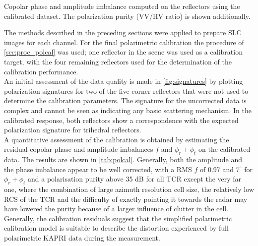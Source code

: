 								
\begin{table}[h]
	\centering
	\caption{Copolar phase and amplitude imbalance computed on the reflectors using the calibrated dataset. The polarization purity (VV/HV ratio) is shown additionally.}
	\label{tab:polcal}
\end{table}		
The methods described in the preceding sections were applied to prepare SLC images for each channel. For the final polarimetric calibration the procedure of \autoref{sec:proc_polcal} was used; one reflector in the scene was used as a calibration target, with the four remaining reflectors used for the determination of the calibration performance.\\
An initial assessment of the data quality is made in \autoref{fig:signatures}  by plotting polarization signatures\cite{VanZyl1987} for two of the five corner reflectors that were not used to determine the calibration parameters.
The signature for the uncorrected data is complex and cannot be seen as indicating any basic scattering mechanism. In the calibrated response, both reflectors show a correspondence with the expected polarization signature for trihedral reflectors.\\
A quantitative assessment of the calibration is obtained by estimating the residual copolar phase and amplitude imbalances $f$ and $\phi_r + \phi_t$ on the calibrated data. The results are shown in \autoref{tab:polcal}. Generally, both the amplitude and the phase imbalance appear to be well corrected, with a RMS $f$ of 0.97 and $7^\circ$ for $\phi_r + \phi_t$ and a polarisation purity above 35 dB for all TCR except the very far one, where the combination of large azimuth resolution cell size, the relatively low RCS of the TCR and  the difficulty of exactly pointing it towards the radar may have lowered the purity because of a larger influence of clutter in the cell.\\ Generally, the calibration residuals suggest that the simplified polarimetric calibration model is suitable to describe the distortion experienced by full polarimetric KAPRI data during the measurement.
